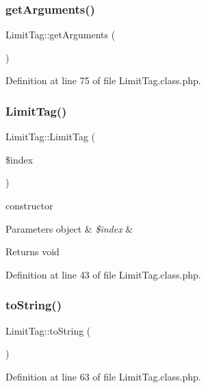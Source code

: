 \subsubsection{\texorpdfstring{get\+Arguments()}{getArguments()}}
{\footnotesize\ttfamily Limit\+Tag\+::get\+Arguments (\begin{DoxyParamCaption}{ }\end{DoxyParamCaption})}



Definition at line 75 of file Limit\+Tag.\+class.\+php.

\hypertarget{classLimitTag_a9b5dbee572b93d0ae32089e8deed7462}{}\label{classLimitTag_a9b5dbee572b93d0ae32089e8deed7462} 
\subsubsection{\texorpdfstring{Limit\+Tag()}{LimitTag()}}
{\footnotesize\ttfamily Limit\+Tag\+::\+Limit\+Tag (\begin{DoxyParamCaption}\item[{}]{\$index }\end{DoxyParamCaption})}

constructor 
\begin{DoxyParams}[1]{Parameters}
object & {\em \$index} & \\
\hline
\end{DoxyParams}
\begin{DoxyReturn}{Returns}
void 
\end{DoxyReturn}


Definition at line 43 of file Limit\+Tag.\+class.\+php.

\hypertarget{classLimitTag_ae557d296324baf6a0381b18361353e85}{}\label{classLimitTag_ae557d296324baf6a0381b18361353e85} 
\subsubsection{\texorpdfstring{to\+String()}{toString()}}
{\footnotesize\ttfamily Limit\+Tag\+::to\+String (\begin{DoxyParamCaption}{ }\end{DoxyParamCaption})}



Definition at line 63 of file Limit\+Tag.\+class.\+php.



